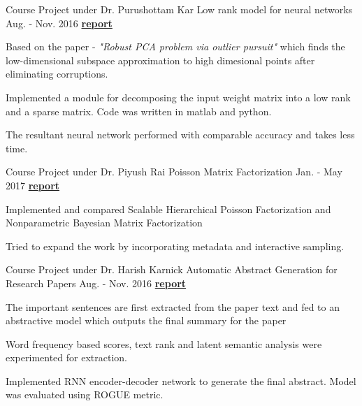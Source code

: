 \begin{cventries}
	
	\cventry
	{Course Project under Dr. Purushottam Kar} %
	{Low rank model for neural networks} %
	{Aug. - Nov. 2016} %
	{
		\textbf{\href{https://www.dropbox.com/s/wb51nni96m6s1nr/Final\%20Project\%20Report.pdf?dl=0}{report \ExternalLink}}	
	} %
	{
		\begin{cvitems} %
			\item { 
				Based on the paper - \textit{"Robust PCA problem via outlier pursuit"} which finds the low-dimensional subspace approximation to high dimesional points after eliminating corruptions.
				}
			\item { 
				Implemented a module for decomposing the input weight matrix into a low rank and a sparse matrix. Code was written in matlab and python.
			}
			\item {
				The resultant neural network performed with comparable accuracy and takes less time.
			}
		\end{cvitems}
	}

	\cventry
	{
		Course Project under Dr. Piyush Rai
	} %
	{Poisson Matrix Factorization} %
	{Jan. - May 2017} %
	{\textbf{\href{https://www.dropbox.com/s/a5gn52k0ggf8m5w/poisson-matrix-factorization.pdf?dl=0}{report \ExternalLink}}} %
	{
		\begin{cvitems} %
			\item { Implemented and compared Scalable Hierarchical Poisson Factorization and Nonparametric Bayesian Matrix Factorization}
			\item { Tried to expand the work by incorporating metadata and interactive sampling.}
		\end{cvitems}
	}
	\cventry
	{Course Project under Dr. Harish Karnick} %
	{Automatic Abstract Generation for Research Papers} %
	{Aug. - Nov. 2016} %
	{\textbf{\href{https://www.dropbox.com/s/h5jqpm20l8bhan6/G4-FinalReport.pdf?dl=0}{report \ExternalLink}}} %
	{
		\begin{cvitems} %
			\item {
				The important sentences are first extracted from the paper text and fed to an abstractive model which outputs the final summary for the paper
			}
			\item {
				Word frequency based scores, text rank and latent semantic analysis were experimented for extraction. 
			}
			\item {
				Implemented RNN encoder-decoder network to generate the final abstract. Model was evaluated using ROGUE metric.
			}
		\end{cvitems}
	}
	

\end{cventries}

